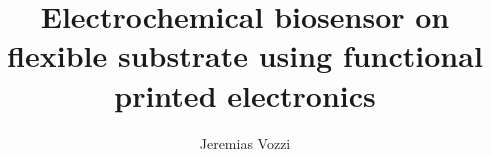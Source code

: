 \documentclass[a4paper,twoside,numbers,spanish]{clases}
\author{Jeremias Vozzi}
\title{Electrochemical biosensor on flexible substrate using functional printed electronics}
\begin{document}
\renewcommand{\chaptername}{Chapter}
\renewcommand{\contentsname}{Table of Contents}
\renewcommand{\listfigurename}{List of Figures}
\renewcommand{\figurename}{Figure}







\tableofcontents
\listoffigures







\appendix
\renewcommand{\appendixname}{Anexo}




\end{document}
